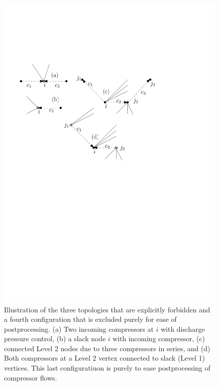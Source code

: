 \documentclass{amsart}
\begin{document}
\begin{figure}[htb]
\centering
\includegraphics[scale=1]{pathologies}
\caption{Illustration of the three topologies that are explicitly forbidden and a fourth configuration that is excluded purely for ease of postprocessing. (a) Two incoming compressors at $i$ with discharge pressure control, (b) a slack node $i$ with incoming compressor, (c) connected Level 2 nodes due to three compressors in series, and (d) Both compressors at a  Level 2 vertex connected to slack (Level 1) vertices. This last configuratiuon is purely to ease postprocessing of compressor flows.}
\label{fig:pathologies}
\end{figure}
\end{document}
